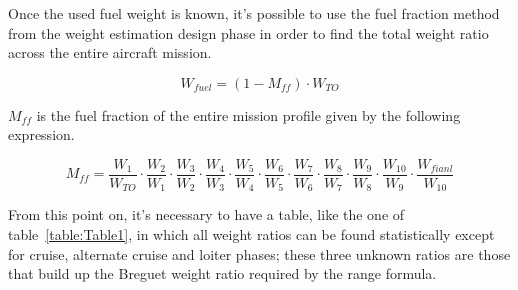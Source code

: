 \bigskip
Once the used fuel weight is known, it’s possible to use the fuel fraction method from the weight estimation design phase in order to find the total weight ratio across the entire aircraft mission. 

\begin{equation}
W_{fuel}=\left(1-M_{ff}\right)\cdot W_{TO}
\label{eqn:Equation1.4}
\end{equation}

\bigskip
$M_{ff}$ is the fuel fraction of the entire mission profile given by the following expression.

\begin{equation}
M_{ff}=\frac{W_1}{W_{TO}}\cdot 
	   \frac{W_2}{W_{1}}\cdot
	   \frac{W_3}{W_{2}}\cdot 
	   \frac{W_4}{W_{3}}\cdot 
	   \frac{W_5}{W_{4}}\cdot 
	   \frac{W_6}{W_{5}}\cdot 
	   \frac{W_7}{W_{6}}\cdot 
	   \frac{W_8}{W_{7}}\cdot 
	   \frac{W_9}{W_{8}}\cdot 
	   \frac{W_{10}}{W_{9}}\cdot 
	   \frac{W_{fianl}}{W_{10}} 
	   \label{eqn:Equation1.5} 
\end{equation}

\bigskip
From this point on, it’s necessary to have a table, like the one of table~\ref{table:Table1}, in which all weight ratios can be found statistically except for cruise, alternate cruise and loiter phases; these three unknown ratios are those that build up the Breguet weight ratio required by the range formula.   

